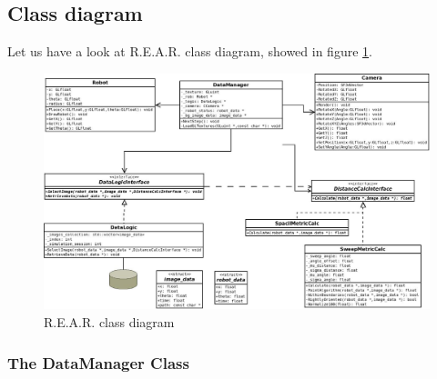 
%

%
\subsection{Class diagram}
%
Let us have a look at \textsf{R.E.A.R.} class diagram, showed in figure 
\ref {fig:class_diagram}.
%
\begin{figure}[!h]
  \begin{center}
    \includegraphics[width=400pt]{img/class_diagram.jpeg}  %
    \caption{\textsf{R.E.A.R.} class diagram}
    \label{fig:class_diagram}
  \end{center}
\end{figure}
%

\subsubsection{The DataManager Class}
\label{sub:datamanager}

